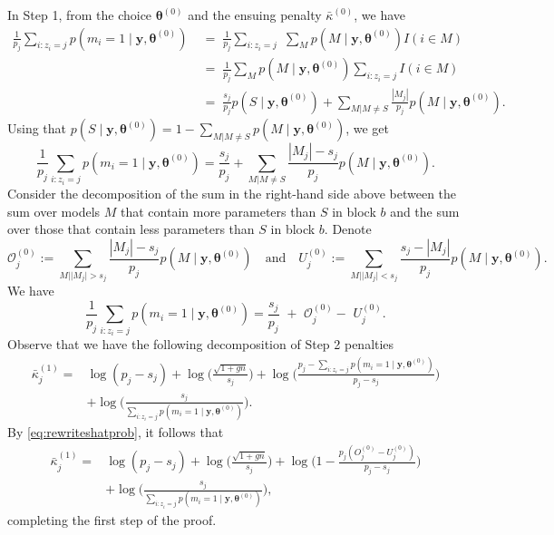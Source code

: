 \documentclass[
  12pt]{article}
\newcommand{\OO}{\mathcal{O}}
\newcommand{\by}{\mathbf{y}}
\newcommand{\btheta}{\boldsymbol{\theta}}
\begin{document}
In Step 1, from the choice $\btheta^{(0)}$ and the ensuing penalty $\bar{\kappa}^{(0)}$, we have
\begin{align*}
     \frac{1}{p_j}\sum_{i:z_i=j}p(m_i=1\mid \by, \btheta^{(0)})
    &\;=\; \frac{1}{p_j}\sum_{i:z_i=j}\,\,\sum_{M}p(M\mid \by, \btheta^{(0)})I(i\in M)\\
   &\;=\; \frac{1}{p_j}\sum_{M }p(M\mid \by, \btheta^{(0)})\sum_{i:z_i=j}I(i\in M) \\
   &\;=\;\frac{s_j}{p_j}p(S\mid \by, \btheta^{(0)}) + \sum_{M  | M \neq S}\frac{|M_j|}{p_j}p(M\mid \by, \btheta^{(0)}).
\end{align*}
Using that $p(S\mid \by, \btheta^{(0)})=1-\sum_{M  | M \neq S}p(M\mid \by, \btheta^{(0)})$, we get
\begin{equation*}
   \frac{1}{p_j}\sum_{i:z_i=j}p(m_i=1\mid \by, \btheta^{(0)})
   =\frac{s_j}{p_j} + \sum_{M  | M \neq S}\frac{|M_j|-s_j}{p_j}p(M\mid \by, \btheta^{(0)}).
\end{equation*}
Consider the decomposition of the sum in the right-hand side above between the sum over models $M$ that contain more parameters than $S$ in block $b$ and the sum over those that contain less parameters than $S$ in block $b$. Denote
$$
    \OO_j^{(0)} := \sum_{M  | |M_j| > s_j}\frac{|M_j|-s_j}{p_j}p(M\mid \by, \btheta^{(0)})\quad\text{and}\quad
    U_j^{(0)} := \sum_{M  | |M_j| < s_j}\frac{s_j-|M_j|}{p_j}p(M\mid \by, \btheta^{(0)}).
$$
We have
\begin{equation}\label{eq:rewriteshatprob}
  \frac{1}{p_j}\sum_{i:z_i=j}p(m_i=1 \mid \by, \btheta^{(0)})  = \frac{s_j}{p_j}\,\,+\,\, \OO_j^{(0)}-\,\,U_j^{(0)}.
\end{equation}
Observe that we have the following decomposition of Step 2 penalties
\begin{align*}
    \bar{\kappa}^{(1)}_j  =
    &\log(p_j-s_j) + \log\Big(\frac{\sqrt{1+gn}}{s_j}\Big) + \log\Bigg(\frac{p_j-\sum_{i:z_i=j}p(m_i=1 \mid \by, \btheta^{(0)}) }{p_j-s_j}\Bigg) \\
    &+ \log\Bigg(\frac{s_j}{\sum_{i:z_i=j}p(m_i=1 \mid \by, \btheta^{(0)}) }\Bigg).
\end{align*}
By \eqref{eq:rewriteshatprob}, it follows that
\begin{equation}\label{eq:decompstep2penprob}
\begin{aligned}
    \bar{\kappa}^{(1)}_j = 
    &\log(p_j-s_j)+\log\Big(\frac{\sqrt{1+gn}}{s_j}\Big)+\log\Bigg(1-\frac{p_j(O^{(0)}_j-U^{(0)}_j)}{p_j-s_j}\Bigg)\\
    &+\log\Bigg(\frac{s_j}{\sum_{i:z_i=j}p(m_i=1 \mid \by, \btheta^{(0)}) }\Bigg),
\end{aligned}
\end{equation}
completing the first step of the proof.
\end{document}
